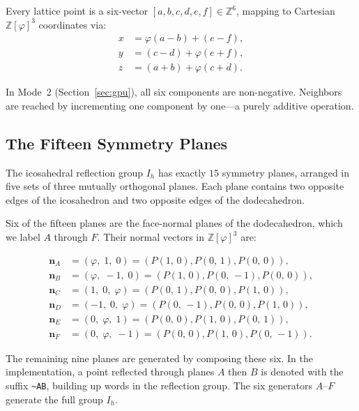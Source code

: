 \documentclass[12pt]{article}
\theoremstyle{definition}
\theoremstyle{remark}
\newcommand{\Z}{\mathbb{Z}}
\newcommand{\Zphi}{\mathbb{Z}[\varphi]}
\newcommand{\Phib}[2]{P(#1,\,#2)}
\begin{document}
Every lattice point is a six-vector $[a,b,c,d,e,f]\in\Z^6$, mapping
to Cartesian $\Zphi^3$ coordinates via:
\begin{align}
  x &= \varphi(a-b) + (e-f), \label{eq:x}\\
  y &= (c-d) + \varphi(e+f), \label{eq:y}\\
  z &= (a+b) + \varphi(c+d). \label{eq:z}
\end{align}

In Mode~2 (Section~\ref{sec:gpu}), all six components are non-negative.
Neighbors are reached by incrementing one component by one---a purely
additive operation.

\subsection{The Fifteen Symmetry Planes}

The icosahedral reflection group $I_h$ has exactly $15$ symmetry planes,
arranged in five sets of three mutually orthogonal planes.  Each plane
contains two opposite edges of the icosahedron and two opposite edges
of the dodecahedron.

Six of the fifteen planes are the face-normal planes of the dodecahedron,
which we label $A$ through $F$.  Their normal vectors in $\Zphi^3$ are:

\begin{align*}
  \mathbf{n}_A &= (\varphi,\; 1,\; 0) = (\Phib{1}{0},\Phib{0}{1},\Phib{0}{0}), \\
  \mathbf{n}_B &= (\varphi,\;-1,\; 0) = (\Phib{1}{0},\Phib{0}{-1},\Phib{0}{0}), \\
  \mathbf{n}_C &= (1,\; 0,\; \varphi) = (\Phib{0}{1},\Phib{0}{0},\Phib{1}{0}), \\
  \mathbf{n}_D &= (-1,\; 0,\;\varphi) = (\Phib{0}{-1},\Phib{0}{0},\Phib{1}{0}), \\
  \mathbf{n}_E &= (0,\;\varphi,\; 1) = (\Phib{0}{0},\Phib{1}{0},\Phib{0}{1}), \\
  \mathbf{n}_F &= (0,\;\varphi,\;-1) = (\Phib{0}{0},\Phib{1}{0},\Phib{0}{-1}).
\end{align*}

The remaining nine planes are generated by composing these six.  In
the implementation, a point reflected through planes $A$ then $B$ is
denoted with the suffix \texttt{\textasciitilde AB}, building up
words in the reflection group.  The six generators $A$--$F$ generate
the full group $I_h$.

\end{document}
